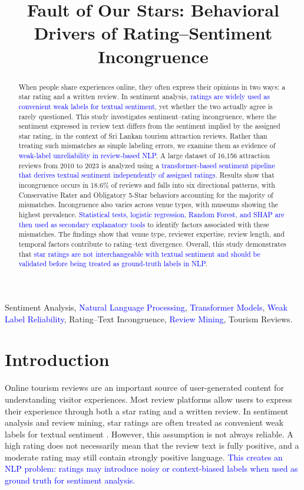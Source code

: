 \documentclass[conference]{IEEEtran}
\newcommand{\changed}[1]{\textcolor{blue}{#1}}
\begin{document}
\title{Fault of Our Stars: Behavioral Drivers of
Rating–Sentiment Incongruence}


\maketitle

\begin{abstract}
When people share experiences online, they often express their opinions in two ways: a star rating and a written review. In sentiment analysis, \changed{ratings are widely used as convenient weak labels for textual sentiment}, yet whether the two actually agree is rarely questioned. This study investigates sentiment–rating incongruence, where the sentiment expressed in review text differs from the sentiment implied by the assigned star rating, in the context of Sri Lankan tourism attraction reviews. Rather than treating such mismatches as simple labeling errors, we examine them as evidence of \changed{weak-label unreliability in review-based NLP}. A large dataset of 16,156 attraction reviews from 2010 to 2023 is analyzed using a \changed{transformer-based sentiment pipeline that derives textual sentiment independently of assigned ratings}. Results show that incongruence occurs in 18.6\% of reviews and falls into six directional patterns, with Conservative Rater and Obligatory 5-Star behaviors accounting for the majority of mismatches. Incongruence also varies across venue types, with museums showing the highest prevalence. \changed{Statistical tests, logistic regression, Random Forest, and SHAP are then used as secondary explanatory tools} to identify factors associated with these mismatches. The findings show that venue type, reviewer expertise, review length, and temporal factors contribute to rating–text divergence. Overall, this study demonstrates that \changed{star ratings are not interchangeable with textual sentiment and should be validated before being treated as ground-truth labels in NLP}.
\end{abstract}

\begin{IEEEkeywords}
Sentiment Analysis, \changed{Natural Language Processing}, \changed{Transformer Models}, \changed{Weak Label Reliability}, Rating–Text Incongruence, \changed{Review Mining}, Tourism Reviews.
\end{IEEEkeywords}

\section{Introduction}
Online tourism reviews are an important source of user-generated content for understanding visitor experiences. Most review platforms allow users to express their experience through both a star rating and a written review. In sentiment analysis and review mining, star ratings are often treated as convenient weak labels for textual sentiment \cite{Pang,alaei}. However, this assumption is not always reliable. A high rating does not necessarily mean that the review text is fully positive, and a moderate rating may still contain strongly positive language. \changed{This creates an NLP problem: ratings may introduce noisy or context-biased labels when used as ground truth for sentiment analysis.}
\end{document}
